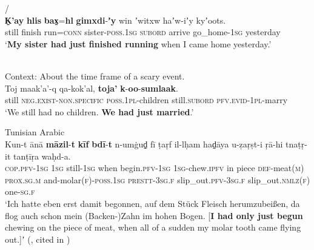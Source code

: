\begin{exe}
	\ex {}/\label{exRemoteNessGitsxanRunning}\\
	\gll \textbf{K̠'ay} \textbf{hlis} \textbf{bax̠}=\textbf{hl} \textbf{gimxdi}-\textbf{ʼy} win ʼwitxw haʼw-iʼy kyʼoots.\\
	still finish run=\textsc{conn} sister-\textsc{poss}.1\textsc{sg} \textsc{subord} arrive go\_home-1\textsc{sg} yesterday\\
	\glt \lq \textbf{My sister had just finished running} when I came home yesterday.' \parencite[69]{Aonuki2021}
	
 	\ex {}\label{exRemotenessKekchiJustMarried}\\
	Context: About the time frame of a scary event.\\
	\gll Toj maak'a'-q qa-kok'al, \textbf{toja'} \textbf{k}-\textbf{oo}-\textbf{sumlaak}.\\
	still \textsc{neg}.\textsc{exist}-\textsc{non}.\textsc{specific} \textsc{poss}.1\textsc{pl-}children still.\textsc{subord} \textsc{pfv}.\textsc{evid}-1\textsc{pl}-marry\\
	\glt \lq We still had no children. \textbf{We had just married}.' \parencite[468]{Kockelman2020}

\ex Tunisian Arabic \label{exTunisianArabicRemotenessTooth}\\
	\gll Kun-t ānā \textbf{māzil}-\textbf{t} \textbf{kīf} \textbf{bdī}-\textbf{t} n-umġud̠̣ fī ṭaṛf il-lḥam had̠āya u-ẓaṛṣt-i ṛā-hi tnaṭṛ-it tanṭīṛa waḥd-a.\\
	\textsc{cop}.\textsc{pfv}-1\textsc{sg} 1\textsc{sg} still-1\textsc{sg} when begin.\textsc{pfv}-1\textsc{sg} 1\textsc{sg}-chew.\textsc{ipfv} in piece \textsc{def}-meat(\textsc{m}) \textsc{prox}.\textsc{sg}.\textsc{m} and-molar(\textsc{f})-\textsc{poss}.1\textsc{sg} \textsc{prestt}-3\textsc{sg}.\textsc{f} slip\_out.\textsc{pfv}-3\textsc{sg}.\textsc{f} slip\_out.\textsc{nmlz}(\textsc{f}) one-\textsc{sg}.\textsc{f}\\
	\glt \lq Ich hatte eben erst damit begonnen, auf dem Stück Fleisch herumzubeißen, da flog auch schon mein (Backen-)Zahn im hohen Bogen. [\textbf{I had only just begun} chewing on the piece of meat, when all of a sudden my molar tooth came flying out.]ʼ (\cite[651]{Singer1984}, cited in \cite{FischerEtAlTunisian})
\end{exe}

